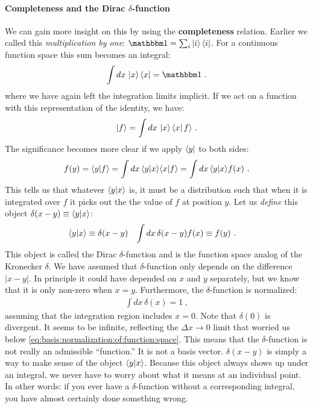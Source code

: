\documentclass[12pt, oneside]{report}    %
\begin{document}
\paragraph{Completeness and the Dirac $\delta$-function} We can gain more insight on this by using the \textbf{completeness} relation. Earlier we called this \emph{multiplication by one}: $\one = \sum_i \ket{i}\bra{i}$. For a continuous function space this sum becomes an integral:
\begin{align}
    \int dx \, \ket{x}\bra{x} = \one \ .
    \label{eq:completeness:continuum}
\end{align}
where we have again left the integration limits implicit. If we act on a function with this representation of the identity, we have:
\begin{align}
    \left|f\right\rangle = \int dx\, \left|x\right\rangle\left\langle x\right| f\rangle  \ .
    \label{eq:function:space:completeness:ket}
\end{align}
The significance becomes more clear if we apply $\left\langle y\right|$ to both sides:
\begin{align}
    f(y) =  \langle y | f \rangle = \int dx\, \langle y | x \rangle \langle x | f \rangle 
    = \int dx\, \langle y | x \rangle f(x) \ .
\end{align}
This tells us that whatever $\langle y | x\rangle$ is, it must be a distribution such that when it is integrated over $f$ it picks out the the value of $f$ at position $y$. Let us \emph{define} this object $\delta(x-y) \equiv \langle y | x \rangle$:
\begin{align}
    \langle y | x \rangle &\equiv \delta(x-y) 
    &
    \int dx\, \delta(x-y) f(x) &\equiv f(y) \ .
\end{align}
This object is called the Dirac $\delta$-function and is the function space analog of the Kronecker $\delta$. We have assumed that $\delta$-function only depends on the difference $|x-y|$. In principle it could have depended on $x$ and $y$ separately, but we know that it is only non-zero when $x=y$. Furthermore, the $\delta$-function is normalized:
\begin{align}
    \int dx\, \delta(x) = 1 \ ,
 \end{align}
 assuming that the integration region includes $x=0$. Note that $\delta(0)$ is divergent. It seems to be infinite, reflecting the $\Delta x\to 0$ limit that worried us below \eqref{eq:basis:normalization:of:function:space}.  This means that the $\delta$-function is not really an admissible ``function.'' It is not a basis vector. $\delta(x-y)$ is simply a way to make sense of the object $\langle y | x\rangle$. Because this object always shows up under an integral, we never have to worry about what it means at an individual point. In other words: if you ever have a $\delta$-function without a corresponding integral, you have almost certainly done something wrong. 
\end{document}

